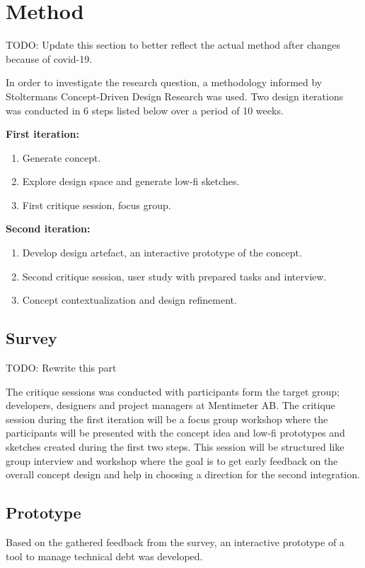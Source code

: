 

\section{Method}

TODO: Update this section to better reflect the actual method after changes because of covid-19.

In order to investigate the research question, a methodology informed by Stoltermans Concept-Driven Design Research was used. \cite{stolterman_concept-driven_2010}
Two design iterations was conducted in 6 steps listed below over a period of 10 weeks.

\smallskip
\textbf{First iteration:}
\begin{enumerate}
  \item Generate concept.
  \item Explore design space and generate low-fi sketches.
  \item First critique session, focus group.
\end{enumerate}

\smallskip
\textbf{Second iteration:}
\begin{enumerate}
  \item Develop design artefact, an interactive prototype of the concept.
  \item Second critique session, user study with prepared tasks and interview.
  \item Concept contextualization and design refinement.
\end{enumerate}
\smallskip

\subsection{Survey}

TODO: Rewrite this part

The critique sessions was conducted with participants form the target group; developers, designers and project managers at Mentimeter AB. 
The critique session during the first iteration will be a focus group workshop where the participants will be presented with the concept idea and low-fi prototypes and sketches created during the first two steps. 
This session will be structured like group interview and workshop where the goal is to get early feedback on the overall concept design and help in choosing a direction for the second integration.

\subsection{Prototype}
Based on the gathered feedback from the survey, an interactive prototype of a tool to manage technical debt was developed.

